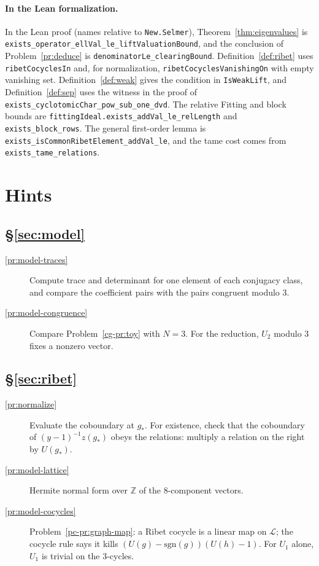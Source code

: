 \documentclass[reqno]{amsart}
\theoremstyle{definition}
\theoremstyle{plain}
\newcommand{\Z}{\mathbb{Z}}
\newcommand{\Lc}{\mathcal{L}}
\begin{document}
\paragraph{In the Lean formalization.}
{\raggedright
In the Lean proof \cite{GL} (names relative to \texttt{New.Selmer}), Theorem~\ref{thm:eigenvalues} is \texttt{exists\_operator\_ellVal\_le\_liftValuationBound}, and the conclusion of Problem~\ref{pr:deduce} is \texttt{denominatorLe\_clearingBound}.  Definition~\ref{def:ribet} uses \texttt{ribetCocyclesIn} and, for normalization, \texttt{ribetCocyclesVanishingOn} with empty vanishing set.  Definition~\ref{def:weak} gives the condition in \texttt{IsWeakLift}, and Definition~\ref{def:sep} uses the witness in the proof of \texttt{exists\_cyclotomicChar\_pow\_sub\_one\_dvd}.  The relative Fitting and block bounds are \texttt{fittingIdeal.exists\_addVal\_le\_relLength} and \texttt{exists\_block\_rows}.  The general first-order lemma is \texttt{exists\_isCommonRibetElement\_addVal\_le}, and the tame cost comes from \texttt{exists\_tame\_relations}.
\par}

\section*{Hints}

\subsection*{\S\ref{sec:model}}
\begin{description}
\item[\ref{pr:model-traces}] Compute trace and determinant for one element of each conjugacy class, and compare the coefficient pairs with the pairs congruent modulo \(3\).
\item[\ref{pr:model-congruence}] Compare Problem~\ref{cg-pr:toy} with \(N = 3\).  For the reduction, \(U_2\) modulo \(3\) fixes a nonzero vector.
\end{description}

\subsection*{\S\ref{sec:ribet}}
\begin{description}
\item[\ref{pr:normalize}] Evaluate the coboundary at \(g_*\).  For existence, check that the coboundary of \((y - 1)^{-1}z(g_*)\) obeys the relations: multiply a relation on the right by \(U(g_*)\).
\item[\ref{pr:model-lattice}] Hermite normal form over \(\Z\) of the \(8\)-component vectors.
\item[\ref{pr:model-cocycles}] Problem~\ref{pc-pr:graph-map}: a Ribet cocycle is a linear map on \(\Lc\); the cocycle rule says it kills \((U(g) - \mathrm{sgn}(g))(U(h) - 1)\).  For \(U_1\) alone, \(U_1\) is trivial on the \(3\)-cycles.
\end{description}
\end{document}
